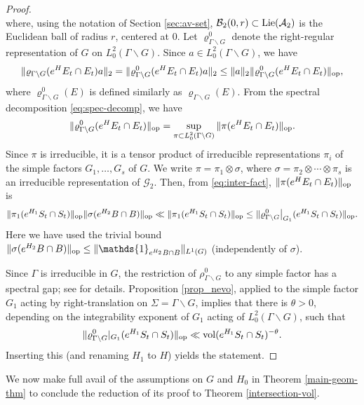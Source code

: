 \documentclass[12pt]{amsart}
\theoremstyle{remark}
\begin{document}
\begin{proof}
\[\]
where, using the notation of Section \ref{sec:av-set}, $\mathcal{B}_2(0,r)\subset {\rm Lie}(\mathcal{A}_2)$ is the Euclidean ball of radius $r$, centered at $0$. Let $\varrho^0_{\Gamma\backslash G}$ denote the right-regular representation of $G$ on  $L^2_0(\Gamma\backslash G)$. Since $a\in L^2_0(\Gamma\backslash G)$, we have
\[
\|\varrho_{\Gamma\backslash G}(e^H E_t \cap E_t)a\|_2=\|\varrho_{\Gamma\backslash G}^0(e^H E_t \cap E_t)a\|_2\leq \|a\|_2\|\varrho_{\Gamma\backslash G}^0(e^H E_t \cap E_t)\|_{\rm op},
\]
where $\varrho^0_{\Gamma\backslash G}(E)$ is defined similarly as  $\varrho_{\Gamma\backslash G}(E)$.
From the spectral decomposition  \eqref{eq:spec-decomp}, we have
\[
\|\varrho_{\Gamma\backslash G}^0(e^H E_t \cap E_t)\|_{\rm op} = \sup_{\pi\subset L^2_0(\Gamma\backslash G)} \|\pi(e^H E_t \cap E_t)\|_{\rm op}.
\]
Since $\pi$ is irreducible, it is a tensor product of irreducible representations $\pi_i$ of the simple factors $G_1,\ldots ,G_s$ of $G$. We write $\pi=\pi_1\otimes \sigma$, where $\sigma=\pi_2\otimes\cdots\otimes\pi_s$ is an irreducible representation of $\mathcal{G}_2$. Then, from \eqref{eq:inter-fact}, $\|\pi(e^H E_t \cap E_t)\|_{\rm op}$ is
\[
\|\pi_1(e^{H_1} S_t \cap S_t)\|_{\rm op}\|\sigma(e^{H_2} B \cap B)\|_{\rm op} \ll \|\pi_1(e^{H_1} S_t \cap S_t)\|_{\rm op}\leq \|\varrho_{\Gamma\backslash G}^0\big|_{G_1}(e^{H_1} S_t \cap S_t)\|_{\rm op}.
\]
Here we have used the trivial bound $\|\sigma(e^{H_2} B \cap B)\|_{\rm op} \leq \|\mathds{1}_{e^{H_2} B \cap B}\|_{L^1(G)}$ (independently of $\sigma$). 

Since $\Gamma$ is irreducible in $G$, the restriction of $\rho_{\Gamma\backslash G}^0$ to any simple factor has a spectral gap; see \cite[p.3]{Kelmer_Sarnak} for details. %
Proposition \ref{prop_nevo}, applied to the simple factor $G_1$ acting by right-translation on $\Sigma=\Gamma\backslash G$, implies that there is $\theta>0$, depending on the integrability exponent of $G_1$ acting of $L^2_0(\Gamma\backslash G)$, such that
\[
\|\varrho_{\Gamma\backslash G}^0|_{G_1}(e^{H_1}S_t \cap S_t)\|_{\rm op}\ll  {\rm vol}(e^{H_1} S_t \cap S_t)^{-\theta}.
\]
Inserting this (and renaming $H_1$ to $H$) yields the statement.\end{proof}

We now make full avail of the assumptions on $G$ and $H_0$ in Theorem \ref{main-geom-thm} to conclude the reduction of its proof to Theorem \ref{intersection-vol}.
\end{document}
